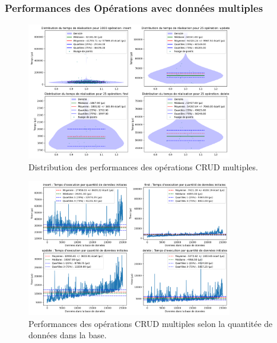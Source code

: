 \documentclass[12pt,a4paper]{report}
\begin{document}
            \subsubsection{Performances des Opérations avec données multiples}
                
                \begin{figure}[H]
                    \centering
                    \includegraphics[width=0.8\textwidth]{../plots/MongoDB/sharding_indexed/global_test_many.png}
                    \caption{Distribution des performances des opérations CRUD multiples.}
                    \label{fig:mongo_sharded_global_many_indexed}
                \end{figure}

                \begin{figure}[H]
                    \centering
                    \includegraphics[width=0.8\textwidth]{../plots/MongoDB/sharding_indexed/test_many_various_data.png}
                    \caption{Performances des opérations CRUD multiples selon la quantitée de données dans la base.}
                    \label{fig:mongo_sharded_many_various_indexed}
                \end{figure}
\end{document}

